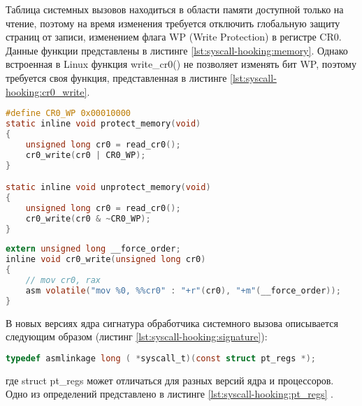         Таблица системных вызовов находиться в области памяти доступной только на чтение,
        поэтому на время изменения требуется отключить глобальную защиту страниц от записи,
        изменением флага WP (Write Protection) в регистре CR0.
        Данные функции представлены в листинге \ref{lst:syscall-hooking:memory}.
        Однако встроенная в Linux функция write\_cr0() не позволяет изменять бит WP, 
        поэтому требуется своя функция, представленная в листинге \ref{lst:syscall-hooking:cr0_write}.
    
    \begin{lstlisting}[language=C, label=lst:syscall-hooking:memory, caption=Функции включение и отключение защиты от записи страницы]
#define CR0_WP 0x00010000
static inline void protect_memory(void)
{
    unsigned long cr0 = read_cr0();
    cr0_write(cr0 | CR0_WP);
}

static inline void unprotect_memory(void)
{
    unsigned long cr0 = read_cr0();
    cr0_write(cr0 & ~CR0_WP);
}
    \end{lstlisting}
    
    \begin{lstlisting}[language=C, label=lst:syscall-hooking:cr0_write, caption=Функция изменения значения регистра cr0]
extern unsigned long __force_order;
inline void cr0_write(unsigned long cr0)
{
    // mov cr0, rax
    asm volatile("mov %0, %%cr0" : "+r"(cr0), "+m"(__force_order));
}
    \end{lstlisting}
    
    В новых версиях ядра сигнатура обработчика системного вызова описывается следующим образом (листинг \ref{lst:syscall-hooking:signature}):
    \begin{lstlisting}[language=C, label=lst:syscall-hooking:signature, caption=Сигнатура обработчиков системных вызовов]
typedef asmlinkage long ( *syscall_t)(const struct pt_regs *);
    \end{lstlisting}
    где struct pt\_regs может отличаться для разных версий ядра и процессоров.
    Одно из определений представлено в листинге \ref{lst:syscall-hooking:pt_regs} \cite{linux-pt_regs}.

